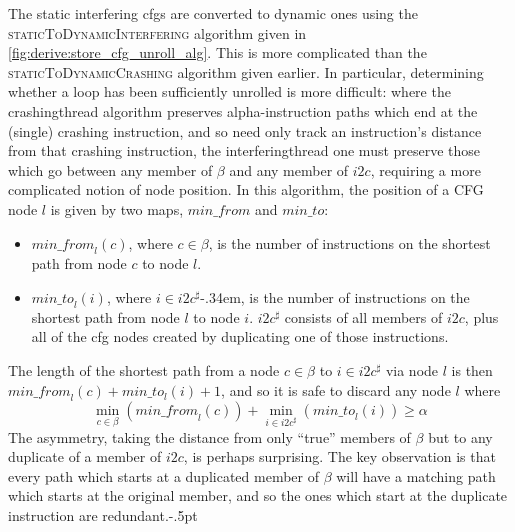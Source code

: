 The static interfering \glspl{cfg} are converted to dynamic ones using
the \textsc{staticToDynamicInterfering} algorithm given in
\autoref{fig:derive:store_cfg_unroll_alg}.  This is more complicated
than the \textsc{staticToDynamicCrashing} algorithm given earlier.  In
particular, determining whether a loop has been sufficiently unrolled
is more difficult: where the \gls{crashingthread} algorithm preserves
\gls{alpha}-instruction paths which end at the (single) \gls{crashing
  instruction}, and so need only track an instruction's distance from
that \gls{crashing instruction}, the \gls{interferingthread} one must
preserve those which go between any member of $\beta$ and any member
of $i2c$, requiring a more complicated notion of node position.  In
this algorithm, the position of a CFG node $l$ is given by two maps,
$\mathit{min\_from}$ and $\mathit{min\_to}$:
\begin{itemize}
\item
  $\mathit{min\_from}_l(c)$, where $c \in \beta$, is the number of
  instructions on the shortest path from node $c$ to node $l$.
\item
  $\mathit{min\_to}_l(i)$, where $i \in i2c^\sharp$\kern-.34em, is the
  number of instructions on the shortest path from node $l$ to node $i$.
  $i2c^\sharp$ consists of all members of $i2c$, plus all of the
  \gls{cfg} nodes created by duplicating one of those instructions.
\end{itemize}
The length of the shortest path from a node $c \in \beta$ to $i \in
i2c^\sharp$ via node $l$ is then $\mathit{min\_from}_l(c) +
\mathit{min\_to}_l(i) + 1$, and so it is safe to discard any
node $l$ where
\begin{displaymath}
\min_{c \in \beta}\left(\mathit{min\_from}_l(c)\right) + \min_{i \in i2c^\sharp}\left(\mathit{min\_to}_l(i)\right) {\geq} \alpha
\end{displaymath}
The asymmetry, taking the distance from only ``true'' members of
$\beta$ but to any duplicate of a member of $i2c$, is perhaps
surprising.  The key observation is that every path which starts at a
duplicated member of $\beta$ will have a matching path which starts at
the original member, and so the ones which start at the duplicate
instruction are redundant.\kern-.5pt

